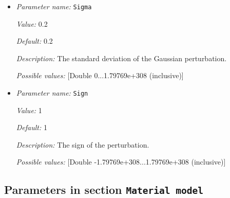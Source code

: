 \begin{itemize}
{\it Description:} The non-dimensional radial distance where the center of the perturbation is placed.


{\it Possible values:} [Double 0...1.79769e+308 (inclusive)]
\item {\it Parameter name:} {\tt Sigma}


{\it Value:} 0.2


{\it Default:} 0.2


{\it Description:} The standard deviation of the Gaussian perturbation.


{\it Possible values:} [Double 0...1.79769e+308 (inclusive)]
\item {\it Parameter name:} {\tt Sign}


{\it Value:} 1


{\it Default:} 1


{\it Description:} The sign of the perturbation.


{\it Possible values:} [Double -1.79769e+308...1.79769e+308 (inclusive)]
\end{itemize}

\subsection{Parameters in section \tt Material model}
\label{parameters:Material_20model}

